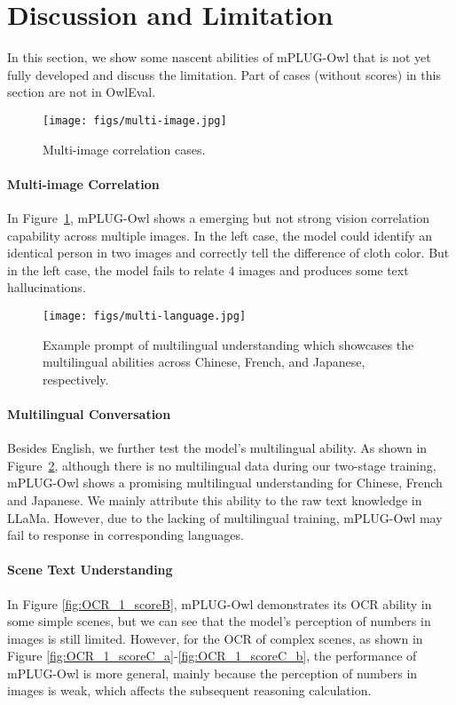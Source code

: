 \documentclass{article}
\newcommand{\modelname}{mPLUG-Owl\xspace}
\newcommand{\evalsetname}{OwlEval\xspace}
\begin{document}
\section{Discussion and Limitation}
In this section, we show some nascent abilities of \modelname that is not yet fully developed and discuss the limitation. Part of cases (without scores) in this section are not in \evalsetname.

\begin{figure}[!ht]
    \centering
    \texttt{[image: figs/multi-image.jpg]}
    \caption{Multi-image correlation cases.}
    \label{fig:appendix_case_twoimg}
    \vspace{-2mm}
\end{figure}

\paragraph{Multi-image Correlation}
In Figure~\ref{fig:appendix_case_twoimg}, \modelname shows a emerging but not strong vision correlation capability across multiple images. In the left case, the model could identify an identical person in two images and correctly tell the difference of cloth color. But in the left case, the model fails to relate 4 images and produces some text hallucinations. 


\begin{figure}[!ht]
    \centering
    \texttt{[image: figs/multi-language.jpg]}
    \caption{Example prompt of multilingual understanding which showcases the multilingual abilities across Chinese, French, and Japanese, respectively.}
    \label{fig:multilingual}
    \vspace{-2mm}
\end{figure}

\paragraph{Multilingual Conversation}
Besides English, we further test the model's multilingual ability. As shown in Figure~\ref{fig:multilingual}, although there is no multilingual data during our two-stage training, \modelname shows a promising multilingual understanding for Chinese, French and Japanese. We mainly attribute this ability to the raw text knowledge in LLaMa\citep{llama}. However, due to the lacking of  multilingual training, \modelname may fail to response in corresponding languages. 


\paragraph{Scene Text Understanding}
In Figure \ref{fig:OCR_1_scoreB}, mPLUG-Owl demonstrates its OCR ability in some simple scenes, but we can see that the model's perception of numbers in images is still limited.
However, for the OCR of complex scenes, as shown in Figure \ref{fig:OCR_1_scoreC_a}-\ref{fig:OCR_1_scoreC_b}, the performance of mPLUG-Owl is more general, mainly because the perception of numbers in images is weak, which affects the subsequent reasoning calculation.
\end{document}
